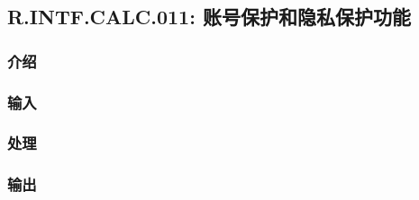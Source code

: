 \subsection{R.INTF.CALC.011: 账号保护和隐私保护功能}
\subsubsection{介绍}
\subsubsection{输入}
\subsubsection{处理}
\subsubsection{输出}